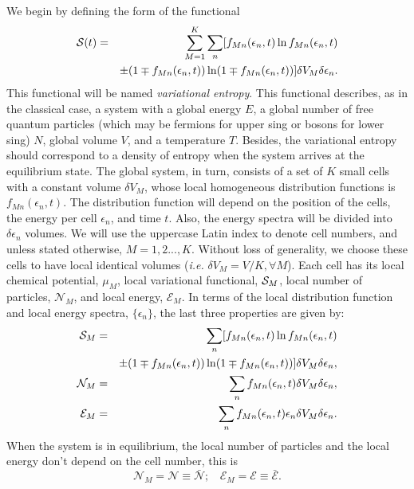 We begin by defining the form of the functional
%
\begin{eqnarray}
    \mathcal{S} (t)&=&\sum_{M=1}^{K} \sum_{n} [ f_{Mn}(\epsilon_{n},t) \ln f_{Mn}(\epsilon_{n},t)\nonumber \\
    &&\pm (1 \mp f_{Mn}(\epsilon_{n},t)) \ln (1 \mp f_{Mn}(\epsilon_{n},t)) ]   \delta V_M \delta \epsilon_n \label{entropy}.
\end{eqnarray}
%
This functional will be named \textit{variational entropy}.
This functional describes, as in the classical case, a system with a global
energy $E$, a global number of free
quantum particles (which may be fermions for upper sing or bosons for lower
sing) $N$, global volume $V$, and a temperature $T$.
Besides, the variational entropy should correspond to a density of entropy when
the system arrives at the equilibrium state. The
global system, in turn, consists of a set of $K$ small cells with a constant
volume $\delta V_M$, whose local homogeneous distribution functions is
$f_{Mn}(\epsilon_{n},t)$. The distribution function will depend on the position
of the cells, the energy per cell $\epsilon_{n}$, and time $t$. Also, the
energy spectra will be divided into $\delta \epsilon_n$ volumes. We will use
the uppercase Latin index to denote cell numbers, and unless stated otherwise,
$M = 1, 2 . . . , K$. Without loss of generality, we choose these cells to have
local identical volumes (\textit{i.e.} $\delta V_M = V/K, \forall M$). Each
cell has its local chemical potential, $\mu_M$, local
variational functional, $\mathcal{S}_M$, local number of particles, $\mathcal{N}_M$, and
local energy, $\mathcal{E}_M$. In terms of the local distribution
function and local energy spectra, $\{\epsilon_{n}\}$, the last three
properties are given by:
%
\begin{eqnarray}
    \mathcal{S}_M &=&  \sum_{n} [ f_{Mn}(\epsilon_{n},t) \ln f_{Mn}(\epsilon_{n},t)\nonumber \\
    &&\pm (1 \mp f_{Mn}(\epsilon_{n},t)) \ln (1 \mp f_{Mn}(\epsilon_{n},t)) ] \delta V_M \delta \epsilon_n \label{entropycell},\\
    {\mathcal{N}}_M&=& \sum_{n}f_{Mn}(\epsilon_{n} ,t) \delta V_M \delta \epsilon_n, \nonumber \\
{\mathcal{E}}_M&=& \sum_{n}f_{Mn}(\epsilon_{n},t)\epsilon_{n} \delta V_M \delta \epsilon_n.
\end{eqnarray}
%
When the system is in equilibrium, the local number of particles and the local
energy don't depend on the cell number, this is
%
\begin{equation}
   {\mathcal{N}}_M=\mathcal{N}\equiv \bar{\mathcal{N}}; \ \ \ \  {\mathcal{E}}_M=\mathcal{E}\equiv \bar{\mathcal{E}}.
\end{equation}
